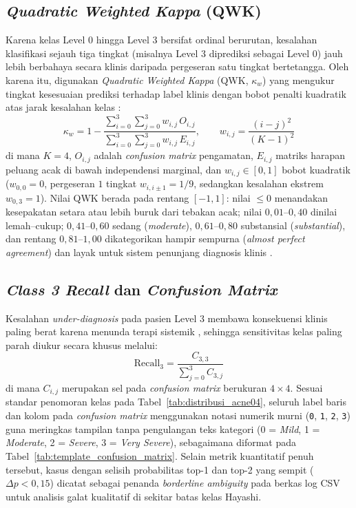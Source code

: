 \subsection{\textit{Quadratic Weighted Kappa} (QWK)}
Karena kelas Level 0 hingga Level 3 bersifat ordinal berurutan, kesalahan klasifikasi sejauh tiga tingkat (misalnya Level 3 diprediksi sebagai Level 0) jauh lebih berbahaya secara klinis daripada pergeseran satu tingkat bertetangga. Oleh karena itu, digunakan \textit{Quadratic Weighted Kappa} (QWK, $\kappa_w$) yang mengukur tingkat kesesuaian prediksi terhadap label klinis dengan bobot penalti kuadratik atas jarak kesalahan kelas \cite{cohen1968weighted}:
\begin{equation}
    \kappa_w = 1 - \frac{\sum_{i=0}^{3}\sum_{j=0}^{3} w_{i,j}\, O_{i,j}}{\sum_{i=0}^{3}\sum_{j=0}^{3} w_{i,j}\, E_{i,j}}, \qquad w_{i,j} = \frac{(i - j)^2}{(K - 1)^2}
\end{equation}
di mana $K = 4$, $O_{i,j}$ adalah \textit{confusion matrix} pengamatan, $E_{i,j}$ matriks harapan peluang acak di bawah independensi marginal, dan $w_{i,j} \in [0, 1]$ bobot kuadratik ($w_{0,0}=0$, pergeseran $1$ tingkat $w_{i,i\pm1}=1/9$, sedangkan kesalahan ekstrem $w_{0,3}=1$). Nilai QWK berada pada rentang $[-1, 1]$: nilai $\le 0$ menandakan kesepakatan setara atau lebih buruk dari tebakan acak; nilai $0,01$--$0,40$ dinilai lemah--cukup; $0,41$--$0,60$ sedang (\textit{moderate}), $0,61$--$0,80$ substansial (\textit{substantial}), dan rentang $0,81$--$1,00$ dikategorikan hampir sempurna (\textit{almost perfect agreement}) dan layak untuk sistem penunjang diagnosis klinis \cite{landis1977measurement, zeng2026}.

\subsection{\textit{Class 3 Recall} dan \textit{Confusion Matrix}}
Kesalahan \textit{under-diagnosis} pada pasien Level 3 membawa konsekuensi klinis paling berat karena menunda terapi sistemik \cite{hayashi2008, vut2025}, sehingga sensitivitas kelas paling parah diukur secara khusus melalui:
\begin{equation}
    \text{Recall}_{3} = \frac{C_{3,3}}{\sum_{j=0}^{3} C_{3,j}}
\end{equation}
di mana $C_{i,j}$ merupakan sel pada \textit{confusion matrix} berukuran $4 \times 4$. Sesuai standar penomoran kelas pada Tabel~\ref{tab:distribusi_acne04}, seluruh label baris dan kolom pada \textit{confusion matrix} menggunakan notasi numerik murni (\texttt{0}, \texttt{1}, \texttt{2}, \texttt{3}) guna meringkas tampilan tanpa pengulangan teks kategori (0 = \textit{Mild}, 1 = \textit{Moderate}, 2 = \textit{Severe}, 3 = \textit{Very Severe}), sebagaimana diformat pada Tabel~\ref{tab:template_confusion_matrix}. Selain metrik kuantitatif penuh tersebut, kasus dengan selisih probabilitas top-1 dan top-2 yang sempit ($\Delta p < 0,15$) dicatat sebagai penanda \textit{borderline ambiguity} pada berkas log CSV untuk analisis galat kualitatif di sekitar batas kelas Hayashi.

